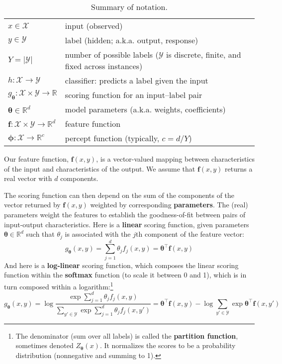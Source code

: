 \documentclass[11pt,letterpaper]{article}
\newcommand{\params}{\mathbf{\theta}}
\begin{document}
\begin{table*}\small
\begin{tabular}{ll}
$x \in \mathcal{X}$ & input (observed) \\
$y \in \mathcal{Y}$ & label (hidden; a.k.a. output, response) \\
$Y = |\mathcal{Y}|$ & number of possible labels ($\mathcal{Y}$ is discrete, finite, and fixed across instances) \\
$h: \mathcal{X}\rightarrow\mathcal{Y}$ & classifier: predicts a label given the input \\
$g_\params: \mathcal{X}\times\mathcal{Y}\rightarrow\mathbb{R}$ & scoring function for an input--label pair \\
$\boldsymbol{\theta} \in \mathbb{R}^d$ & model parameters (a.k.a. weights, coefficients) \\
$\mathbf{f}: \mathcal{X}\times\mathcal{Y}\rightarrow\mathbb{R}^d$ & feature function \\
$\boldsymbol{\phi}: \mathcal{X}\rightarrow\mathbb{R}^c$ & percept function (typically, $c = d/Y$) \\
\end{tabular}
\caption{Summary of notation.}
\label{tbl:notation}
\end{table*}


Our feature function, $\mathbf{f}(x,y)$, is a vector-valued mapping between 
characteristics of the input and characteristics of the output.
We assume that $\mathbf{f}(x,y)$ returns a real vector with $d$ components.

The scoring function can then depend on the sum of the components of the vector returned by $\mathbf{f}(x,y)$ weighted by corresponding {\bf parameters}.
The (real) parameters weight the features to establish the goodness-of-fit between pairs of input-output characteristics.  
Here is a {\bf linear} scoring function, 
given parameters $\boldsymbol{\theta}\in\mathbb{R}^d$ such that $\theta_j$ is associated with the $j$th component of the feature vector:
\begin{equation}\label{eq:linear}
g_{\boldsymbol{\theta}}(x,y) = \sum_{j=1}^d \theta_j f_j(x,y)
= \boldsymbol{\theta}^{\top} \mathbf{f}(x,y)
\end{equation}
And here is a {\bf log-linear} scoring function, which composes the linear scoring function within the 
{\bf softmax} function (to scale it between 0 and 1), which is in turn composed within a logarithm:\footnote{The denominator (sum over all labels) is called the {\bf partition function}, sometimes denoted $Z_{\boldsymbol{\theta}}(x)$. It normalizes the scores to be a probability distribution (nonnegative and summing to 1).}
\begin{equation}\label{eq:softmax}
g_{\boldsymbol{\theta}}(x,y) = \log\frac{\exp{\sum_{j=1}^d \theta_j f_j(x,y)}}{\sum_{y'\in\mathcal{Y}}\exp{\sum_{j=1}^d \theta_j f_j(x,y')}}
= \boldsymbol{\theta}^{\top} \mathbf{f}(x,y) - \log{\sum_{y'\in\mathcal{Y}}\exp{\boldsymbol{\theta}^{\top} \mathbf{f}(x,y')}}
\end{equation}
\end{document}
